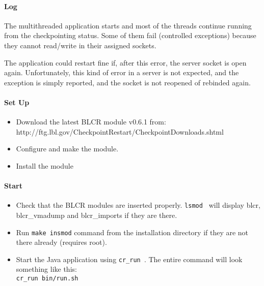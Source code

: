 \paragraph{Log}
The multithreaded application starts and most of the threads continue running from the checkpointing status. Some of them fail (controlled exceptions)
because they cannot read/write in their assigned sockets.

The application could restart fine if, after this error, the server socket is open again. Unfortunately, this kind of error in a server is
not expected, and the exception is simply reported, and the socket is not re\-opened of re\-binded again.

\paragraph{Set Up}
\begin{itemize}
\item Download the latest BLCR module v0.6.1 from:\\
	http://ftg.lbl.gov/CheckpointRestart/CheckpointDownloads.shtml
\item Configure and make the module.
\item Install the module
\end{itemize}


\paragraph{Start}
\begin{itemize}
\item Check that the BLCR modules are inserted properly. {\tt lsmod } will display blcr, blcr\_vmadump and blcr\_imports if they are there.
\item Run {\tt make insmod} command from the installation directory if they are not there already (requires root).
\item Start the Java application using {\tt cr\_run }. The entire command will look something like this:\\
	{\tt cr\_run bin/run.sh}
\end{itemize}

